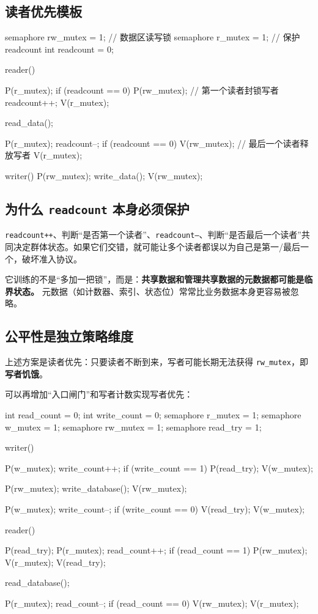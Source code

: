 \documentclass[11pt,a4paper]{ctexart}
\newcommand{\kw}[1]{\textbf{#1}}
\newcommand{\code}[1]{\texttt{#1}}
\begin{document}
\subsection{读者优先模板}

\begin{codeblock}
semaphore rw_mutex = 1;  // 数据区读写锁
semaphore r_mutex  = 1;  // 保护 readcount
int readcount = 0;

reader() {
    P(r_mutex);
    if (readcount == 0)
        P(rw_mutex);      // 第一个读者封锁写者
    readcount++;
    V(r_mutex);

    read_data();

    P(r_mutex);
    readcount--;
    if (readcount == 0)
        V(rw_mutex);      // 最后一个读者释放写者
    V(r_mutex);
}

writer() {
    P(rw_mutex);
    write_data();
    V(rw_mutex);
}
\end{codeblock}

\subsection{为什么 \code{readcount} 本身必须保护}

\code{readcount++}、判断“是否第一个读者”、\code{readcount--}、判断“是否最后一个读者”共同决定群体状态。如果它们交错，就可能让多个读者都误以为自己是第一/最后一个，破坏准入协议。

\begin{corebox}[读者--写者问题要检查的三件事]
它训练的不是“多加一把锁”，而是：\kw{共享数据和管理共享数据的元数据都可能是临界状态。} 元数据（如计数器、索引、状态位）常常比业务数据本身更容易被忽略。
\end{corebox}

\subsection{公平性是独立策略维度}

上述方案是读者优先：只要读者不断到来，写者可能长期无法获得 \code{rw\_mutex}，即\kw{写者饥饿}。

可以再增加“入口闸门”和写者计数实现写者优先：

\begin{codeblock}
int read_count = 0;
int write_count = 0;
semaphore r_mutex = 1;
semaphore w_mutex = 1;
semaphore rw_mutex = 1;
semaphore read_try = 1;

writer() {
    P(w_mutex);
    write_count++;
    if (write_count == 1) P(read_try);
    V(w_mutex);

    P(rw_mutex);
    write_database();
    V(rw_mutex);

    P(w_mutex);
    write_count--;
    if (write_count == 0) V(read_try);
    V(w_mutex);
}

reader() {
    P(read_try);
    P(r_mutex);
    read_count++;
    if (read_count == 1) P(rw_mutex);
    V(r_mutex);
    V(read_try);

    read_database();

    P(r_mutex);
    read_count--;
    if (read_count == 0) V(rw_mutex);
    V(r_mutex);
}
\end{codeblock}
\end{document}
